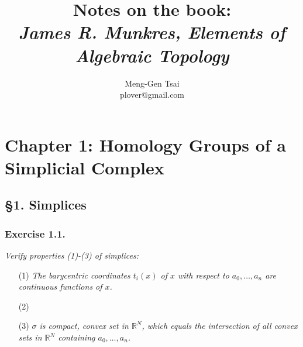 \documentclass{article}
\title{\textbf{Notes on the book: \\ \emph{James R. Munkres, Elements of Algebraic Topology}}}
\author{Meng-Gen Tsai \\ plover@gmail.com}
\begin{document}
\maketitle
\tableofcontents












\newpage
\section*{Chapter 1: Homology Groups of a Simplicial Complex \\}



\subsection*{\S 1. Simplices \\}



\subsubsection*{Exercise 1.1.}
\emph{Verify properties (1)-(3) of simplices:}
\begin{enumerate}
\item[(1)]
  \emph{The barycentric coordinates $t_i(x)$ of $x$ with respect to $a_0, \ldots, a_n$
  are continuous functions of $x$.}

\item[(2)]
  \emph{}

\item[(3)]
  \emph{$\sigma$ is compact, convex set in $\mathbb{R}^N$,
  which equals the intersection of all convex sets in $\mathbb{R}^N$ containing $a_0, \ldots, a_n$.} \\
\end{enumerate}
\end{document}
